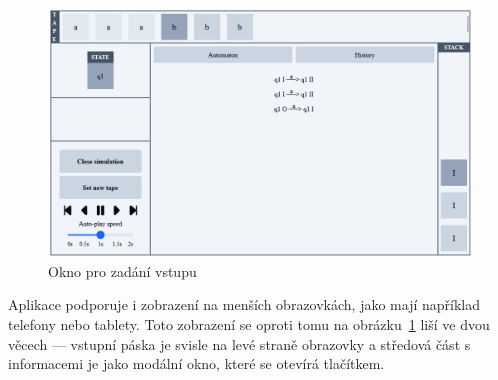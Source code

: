\begin{figure}[h]
    \centering
    \includegraphics[width=\textwidth]{Figures/PrntScrn_UI_Simulator.png}
    \caption{Okno pro zadání vstupu}\label{fig:Simulator}
\end{figure}

Aplikace podporuje i zobrazení na menších obrazovkách, jako mají například telefony nebo tablety. Toto zobrazení se oproti tomu na obrázku~\ref{fig:Simulator} liší ve dvou věcech --- vstupní páska je svisle na levé straně obrazovky a středová část s informacemi je jako modální okno, které se otevírá tlačítkem.

\endinput